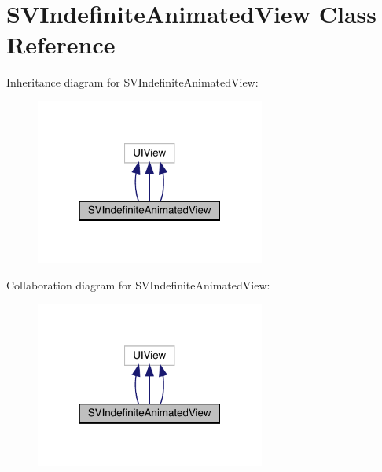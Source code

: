 \hypertarget{interface_s_v_indefinite_animated_view}{}\section{S\+V\+Indefinite\+Animated\+View Class Reference}
\label{interface_s_v_indefinite_animated_view}


Inheritance diagram for S\+V\+Indefinite\+Animated\+View\+:\nopagebreak
\begin{figure}[H]
\begin{center}
\leavevmode
\includegraphics[width=214pt]{interface_s_v_indefinite_animated_view__inherit__graph}
\end{center}
\end{figure}


Collaboration diagram for S\+V\+Indefinite\+Animated\+View\+:\nopagebreak
\begin{figure}[H]
\begin{center}
\leavevmode
\includegraphics[width=214pt]{interface_s_v_indefinite_animated_view__coll__graph}
\end{center}
\end{figure}
